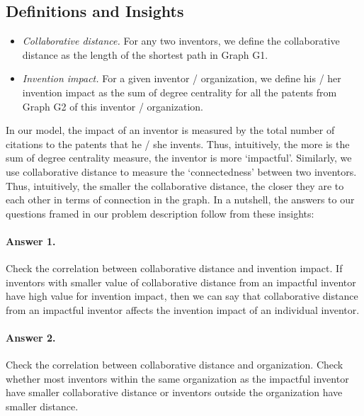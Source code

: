 \subsection{Definitions and Insights}

	\begin{itemize}
		\item {\em Collaborative distance.} For any two inventors, we define
		the collaborative distance as the length of the shortest path in
		Graph G1.
		\item {\em Invention impact.} For a given inventor / organization, we define his /
		her invention impact as the sum of degree centrality for
		all the patents from Graph G2 of this inventor / organization.
	\end{itemize}


In our model, the impact of an inventor is measured by the total number of citations
to the patents that he / she invents. Thus, intuitively, the more is the sum of degree
centrality measure, the inventor is more `impactful'. Similarly, we use
collaborative distance to measure the `connectedness' between two inventors.
Thus, intuitively, the smaller the collaborative distance, the closer they are
to each other in terms of connection in the graph.  In a nutshell, the answers
to our questions framed in our problem description follow from these insights:

\paragraph{Answer 1.} Check the correlation between collaborative distance and invention impact.
If inventors with smaller value of collaborative distance from an impactful inventor have 
high value for invention impact, then we can say that collaborative distance from an impactful inventor
affects the invention impact of an individual inventor.

\paragraph{Answer 2.} Check the correlation between collaborative distance and organization.
Check whether most inventors within the same organization as the impactful inventor
have smaller collaborative distance or inventors outside the organization have
smaller distance.


